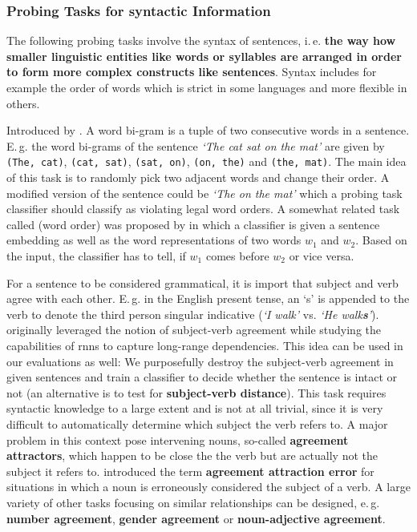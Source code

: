 \subsubsection{Probing Tasks for syntactic Information}
\label{sec:presentation_probing_tasks_syntactic}

The following probing tasks involve the syntax of sentences, i.\,e. \textbf{the way how smaller linguistic entities like words or syllables are arranged in order to form more complex constructs like sentences}. Syntax includes for example the order of words which is strict in some languages and more flexible in others.

  Introduced by \citep{Conneau.2018b}. A word bi-gram is a tuple of two consecutive words in a sentence. E.\,g. the word bi-grams of the sentence \textit{`The cat sat on the mat'} are given by \texttt{(The, cat)}, \texttt{(cat, sat)}, \texttt{(sat, on)}, \texttt{(on, the)} and \texttt{(the, mat)}. The main idea of this task is to randomly pick two adjacent words and change their order. A modified version of the sentence could be \textit{`The   on the mat'} which a probing task classifier should classify as violating legal word orders. A somewhat related task called  (word order) was proposed by \citep{Adi.2017} in which a classifier is given a sentence embedding as well as the word representations of two words $w_1$ and $w_2$. Based on the input, the classifier has to tell, if $w_1$ comes before $w_2$ or vice versa.

  For a sentence to be considered grammatical, it is import that subject and verb agree with each other. E.\,g. in the English present tense, an `s' is appended to the verb to denote the third person singular indicative (\textit{`I walk'} vs. \textit{`He walk\textbf{s}'}). \citep{Linzen.2016} originally leveraged the notion of subject-verb agreement while studying the capabilities of \glspl{rnn} to capture long-range dependencies. This idea can be used in our evaluations as well: We purposefully destroy the subject-verb agreement in given sentences and train a classifier to decide whether the sentence is intact or not (an alternative is to test for \textbf{subject-verb distance}). This task requires syntactic knowledge to a large extent and is not at all trivial, since it is very difficult to automatically determine which subject the verb refers to. A major problem in this context pose intervening nouns, so-called \textbf{agreement attractors}, which happen to be close the the verb but are actually not the subject it refers to. \citep{Bock.1991} introduced the term \textbf{agreement attraction error} for situations in which a noun is erroneously considered the subject of a verb. A large variety of other tasks focusing on similar relationships can be designed, e.\,g. \textbf{number agreement}, \textbf{gender agreement} or \textbf{noun-adjective agreement}.

